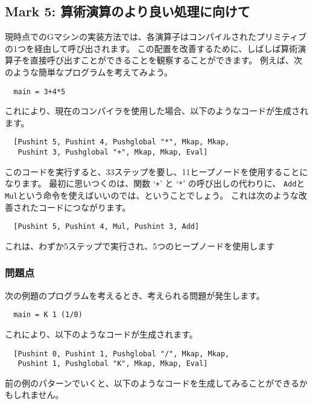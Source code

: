 \documentclass{jarticle}
\begin{document}
\subsection{Mark 5: 算術演算のより良い処理に向けて}

現時点でのGマシンの実装方法では、各演算子はコンパイルされたプリミティブの1つを経由して呼び出されます。
この配置を改善するために、しばしば算術演算子を直接呼び出すことができることを観察することができます。
例えば、次のような簡単なプログラムを考えてみよう。

\begin{verbatim}
  main = 3+4*5
\end{verbatim}

これにより、現在のコンパイラを使用した場合、以下のようなコードが生成されます。

\begin{verbatim}
  [Pushint 5, Pushint 4, Pushglobal "*", Mkap, Mkap,
   Pushint 3, Pushglobal "+", Mkap, Mkap, Eval]
\end{verbatim}

このコードを実行すると、33ステップを要し、11ヒープノードを使用することになります。
最初に思いつくのは、関数 `\texttt{+}' と `\texttt{*}' の呼び出しの代わりに、
\texttt{Add}と\texttt{Mul}という命令を使えばいいのでは、ということでしょう。
これは次のような改善されたコードにつながります。

\begin{verbatim}
  [Pushint 5, Pushint 4, Mul, Pushint 3, Add]
\end{verbatim}

これは、わずか5ステップで実行され、5つのヒープノードを使用します

\subsubsection{問題点}

次の例題のプログラムを考えるとき、考えられる問題が発生します。

\begin{verbatim}
  main = K 1 (1/0)
\end{verbatim}

これにより、以下のようなコードが生成されます。

\begin{verbatim}
  [Pushint 0, Pushint 1, Pushglobal "/", Mkap, Mkap,
   Pushint 1, Pushglobal "K", Mkap, Mkap, Eval]
\end{verbatim}

前の例のパターンでいくと、以下のようなコードを生成してみることができるかもしれません。
\end{document}
